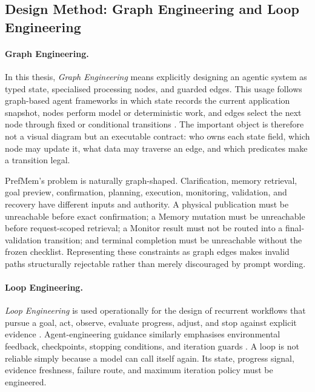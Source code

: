 \documentclass{article}
\begin{document}
\subsection{Design Method: Graph Engineering and Loop Engineering}
\label{subsec:methodology-graph-loop}

\paragraph{Graph Engineering.}
In this thesis, \emph{Graph Engineering} means explicitly designing an agentic
system as typed state, specialised processing nodes, and guarded edges. This
usage follows graph-based agent frameworks in which state records the current
application snapshot, nodes perform model or deterministic work, and edges
select the next node through fixed or conditional transitions
\parencite{langchain2026graphapi}. The important object is therefore not a
visual diagram but an executable contract: who owns each state field, which
node may update it, what data may traverse an edge, and which predicates make a
transition legal.

PrefMem's problem is naturally graph-shaped. Clarification, memory retrieval,
goal preview, confirmation, planning, execution, monitoring, validation, and
recovery have different inputs and authority. A physical publication must be
unreachable before exact confirmation; a Memory mutation must be unreachable
before request-scoped retrieval; a Monitor result must not be routed into a
final-validation transition; and terminal completion must be unreachable
without the frozen checklist. Representing these constraints as graph edges
makes invalid paths structurally rejectable rather than merely discouraged by
prompt wording.

\paragraph{Loop Engineering.}
\emph{Loop Engineering} is used operationally for the design of recurrent
workflows that pursue a goal, act, observe, evaluate progress, adjust, and stop
against explicit evidence \parencite{ibm2026loopengineering}. Agent-engineering
guidance similarly emphasises environmental feedback, checkpoints, stopping
conditions, and iteration guards \parencite{anthropic2024effectiveagents}. A
loop is not reliable simply because a model can call itself again. Its state,
progress signal, evidence freshness, failure route, and maximum iteration
policy must be engineered.
\end{document}
